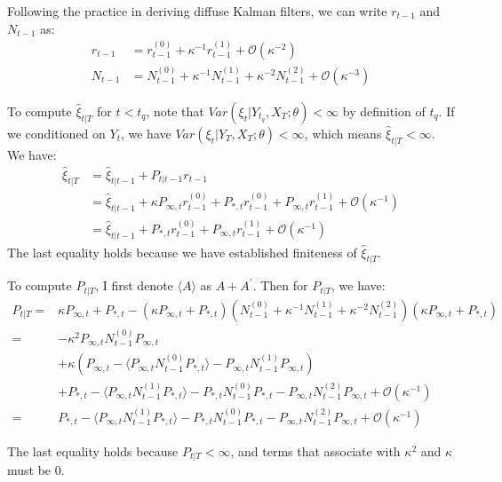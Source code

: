 \documentclass[10pt, titlepage]{article}
\numberwithin{equation}{section}
\begin{document}
Following the practice in deriving diffuse Kalman filters, we can write $r_{t-1}$ and $N_{t-1}$ as: 
\begin{align*}
    r_{t-1} &= r_{t-1}^{(0)} + \kappa^{-1}r_{t-1}^{(1)} + \mathcal{O}(\kappa^{-2}) \\
    N_{t-1} &= N_{t-1}^{(0)} + \kappa^{-1}N_{t-1}^{(1)} + \kappa^{-2}N_{t-1}^{(2)} + \mathcal{O}(\kappa^{-3})
\end{align*}

To compute $\hat{\xi}_{t|T}$ for $t<t_q$, note that $Var(\xi_t|Y_{t_q},X_T;\theta)<\infty$ by definition of $t_q$. If we conditioned on $Y_t$, we have $Var(\xi_t|Y_T,X_T;\theta)<\infty$, which means $\hat{\xi}_{t|T}<\infty$. We have:
\begin{align*}
    \hat{\xi}_{t|T} &= \hat{\xi}_{t|t-1} + P_{t|t-1}r_{t-1} \\
    &= \hat{\xi}_{t|t-1} + \kappa P_{\infty,t}r_{t-1}^{(0)}+P_{*,t}r_{t-1}^{(0)}+P_{\infty,t}r_{t-1}^{(1)}+\mathcal{O}(\kappa^{-1}) \\
    &= \hat{\xi}_{t|t-1} + P_{*,t}r_{t-1}^{(0)}+P_{\infty,t}r_{t-1}^{(1)}+\mathcal{O}(\kappa^{-1})
\end{align*}
The last equality holds because we have established finiteness of $\hat{\xi}_{t|T}$. 

To compute $P_{t|T}$, I first denote $\langle A\rangle$ as $A+A^{'}$. Then for $P_{t|T}$, we have:
\begin{align*}
    P_{t|T} =& \kappa P_{\infty,t} + P_{*,t} - (\kappa P_{\infty,t} + P_{*,t})(N_{t-1}^{(0)}+\kappa^{-1}N_{t-1}^{(1)}+ \kappa^{-2}N_{t-1}^{(2)})(\kappa P_{\infty,t} + P_{*,t}) \\
    =& -\kappa^2P_{\infty,t}N_{t-1}^{(0)}P_{\infty,t} \\
    &+ \kappa (P_{\infty,t} - \langle P_{\infty,t}N_{t-1}^{(0)}P_{*,t}\rangle - P_{\infty,t}N_{t-1}^{(1)}P_{\infty,t}) \\
    &+ P_{*,t} - \langle P_{\infty,t}N_{t-1}^{(1)}P_{*,t}\rangle - P_{*,t}N_{t-1}^{(0)}P_{*,t} 
        - P_{\infty,t}N_{t-1}^{(2)}P_{\infty,t} + \mathcal{O}(\kappa^{-1}) \\
    =& P_{*,t} - \langle P_{\infty,t}N_{t-1}^{(1)}P_{*,t}\rangle - P_{*,t}N_{t-1}^{(0)}P_{*,t} 
        - P_{\infty,t}N_{t-1}^{(2)}P_{\infty,t} + \mathcal{O}(\kappa^{-1}) 
\end{align*}

The last equality holds because  $P_{t|T}<\infty$, and terms that associate with $\kappa^{2}$ and $\kappa$ must be $0$.
\end{document}
